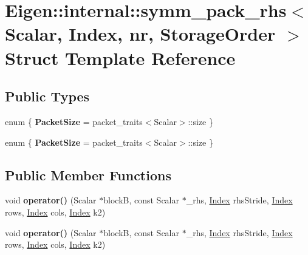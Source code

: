 \hypertarget{struct_eigen_1_1internal_1_1symm__pack__rhs}{}\section{Eigen\+:\+:internal\+:\+:symm\+\_\+pack\+\_\+rhs$<$ Scalar, Index, nr, Storage\+Order $>$ Struct Template Reference}
\label{struct_eigen_1_1internal_1_1symm__pack__rhs}
\subsection*{Public Types}
\begin{DoxyCompactItemize}
\item 
\mbox{\label{struct_eigen_1_1internal_1_1symm__pack__rhs_a767fce4670a2055d8b8403d715d0c9da}} 
enum \{ {\bfseries Packet\+Size} = packet\+\_\+traits$<$Scalar$>$\+:\+:size
 \}
\item 
\mbox{\label{struct_eigen_1_1internal_1_1symm__pack__rhs_a8a559d4bb4b20678f1880b7bed803075}} 
enum \{ {\bfseries Packet\+Size} = packet\+\_\+traits$<$Scalar$>$\+:\+:size
 \}
\end{DoxyCompactItemize}
\subsection*{Public Member Functions}
\begin{DoxyCompactItemize}
\item 
\mbox{\label{struct_eigen_1_1internal_1_1symm__pack__rhs_a8cd8d2fe9b65b3836495e781d907cfeb}} 
void {\bfseries operator()} (Scalar $\ast$blockB, const Scalar $\ast$\+\_\+rhs, \hyperlink{namespace_eigen_a62e77e0933482dafde8fe197d9a2cfde}{Index} rhs\+Stride, \hyperlink{namespace_eigen_a62e77e0933482dafde8fe197d9a2cfde}{Index} rows, \hyperlink{namespace_eigen_a62e77e0933482dafde8fe197d9a2cfde}{Index} cols, \hyperlink{namespace_eigen_a62e77e0933482dafde8fe197d9a2cfde}{Index} k2)
\item 
\mbox{\label{struct_eigen_1_1internal_1_1symm__pack__rhs_a8cd8d2fe9b65b3836495e781d907cfeb}} 
void {\bfseries operator()} (Scalar $\ast$blockB, const Scalar $\ast$\+\_\+rhs, \hyperlink{namespace_eigen_a62e77e0933482dafde8fe197d9a2cfde}{Index} rhs\+Stride, \hyperlink{namespace_eigen_a62e77e0933482dafde8fe197d9a2cfde}{Index} rows, \hyperlink{namespace_eigen_a62e77e0933482dafde8fe197d9a2cfde}{Index} cols, \hyperlink{namespace_eigen_a62e77e0933482dafde8fe197d9a2cfde}{Index} k2)
\end{DoxyCompactItemize}


